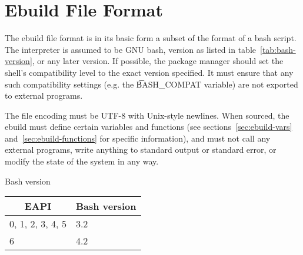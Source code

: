 \chapter{Ebuild File Format}
\label{sec:ebuild-format}

 The ebuild file format is in its basic form a subset of the format of
a bash script. The interpreter is assumed to be GNU bash, version as listed in
table~\ref{tab:bash-version}, or any later version. If possible, the package manager should set
the shell's compatibility level to the exact version specified. It must ensure that any such
compatibility settings (e.g. the \t{BASH\_COMPAT} variable) are not exported to external programs.

The file encoding must be UTF-8 with Unix-style newlines. When sourced, the ebuild must define
certain variables and functions (see sections~\ref{sec:ebuild-vars} and~\ref{sec:ebuild-functions}
for specific information), and must not call any external programs, write anything to standard
output or standard error, or modify the state of the system in any way.

\begin{centertable}{Bash version}
    \label{tab:bash-version}
    \begin{tabular}{ll}
      \toprule
      \multicolumn{1}{c}{\textbf{EAPI}} &
      \multicolumn{1}{c}{\textbf{Bash version}} \\
      \midrule
      0, 1, 2, 3, 4, 5  & 3.2 \\
      6                 & 4.2 \\
      \bottomrule
    \end{tabular}
\end{centertable}


